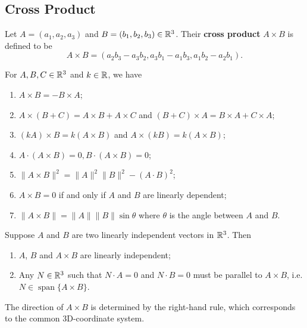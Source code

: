 \documentclass[a4paper]{ctexart}
\begin{document}
    \subsection{Cross Product}
    \begin{mydef}
        Let $A=(a_1,a_2,a_3)$ and $B=(b_1,b_2,b_3) \in \mathbb{R}^3$. Their \textbf{cross product} $A \times B$ is defined to be
        $$ A \times B = (a_2 b_3 - a_3 b_2, a_3 b_1 - a_1 b_3, a_1 b_2 - a_2 b_1). $$
    \end{mydef}
    \begin{mythm}
        For $A,B,C\in \mathbb{R}^3$ and $k \in \mathbb{R}$, we have
        \begin{enumerate}[label=(\arabic*)]
            \item $A \times B = - B \times A$;
            \item $A \times (B+C) = A \times B + A \times C$ and $(B+C)\times A = B\times A + C\times A$;
            \item $(kA) \times B = k (A\times B)$ and $A\times (kB) = k (A\times B)$;
            \item $A\cdot (A\times B) = 0, B \cdot (A\times B) = 0$;
            \item $\| A \times B\| ^2 = \|A\|^2 \|B\|^2 - (A\cdot B)^2$;
            \item $A\times B = 0$ if and only if $A$ and $B$ are linearly dependent;
            \item $\|A\times B\| = \|A\|\|B\|\sin\theta$ where $\theta$ is the angle between $A$ and $B$.
            
        \end{enumerate}
    \end{mythm}
    \begin{mythm}
        Suppose $A$ and $B$ are two linearly independent vectors in $\mathbb{R}^3$. Then
        \begin{enumerate}
            \item $A$, $B$ and $A\times B$ are linearly independent;
            \item Any $N\in \mathbb{R}^3$ such that $N\cdot A = 0$ and $N\cdot B = 0$ must be parallel to $A\times B$, i.e. $ N \in \operatorname{span} \{A\times B\}$.
        \end{enumerate}
    \end{mythm}
    \begin{myrmk}
        The direction of $A\times B$ is determined by the right-hand rule, which corresponds to the common 3D-coordinate system. 
    \end{myrmk}
\end{document}
